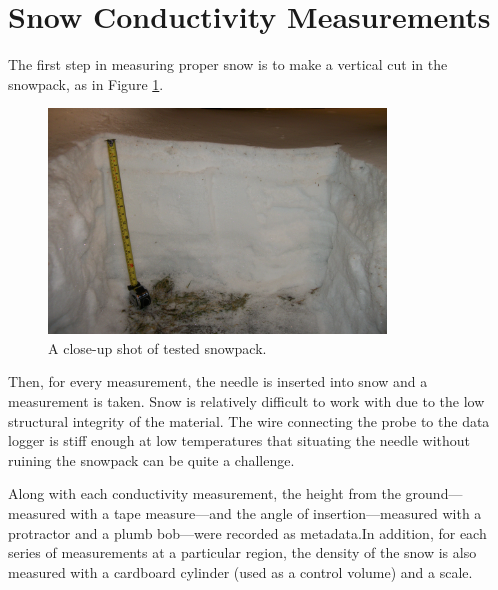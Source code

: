 \section{Snow Conductivity Measurements}

The first step in measuring proper snow is to make a vertical cut in the
snowpack, as in Figure \ref{fig:snowpack}.

\begin{figure}[h]
\centering
\includegraphics[width=0.8\textwidth]{fig/snowpack.jpg}
\caption{A close-up shot of tested snowpack.}
\label{fig:snowpack}
\end{figure}

Then, for every measurement, the needle is inserted into snow and a measurement
is taken. Snow is relatively difficult to work with due to the low structural 
integrity of the material.  The wire connecting the probe to the data logger is
stiff enough at low temperatures that situating the needle without ruining the
snowpack can be quite a challenge.

Along with each conductivity measurement, the height from the ground---measured
with a tape measure---and the angle of insertion---measured with a protractor
and a plumb bob---were recorded as metadata.In addition, for each series of measurements at a particular region, the density
of the snow is also measured with a cardboard cylinder (used as a control volume)
and a scale.

